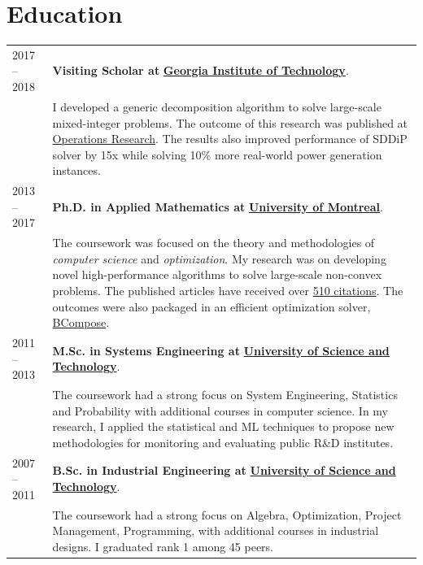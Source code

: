 \documentclass[10PT,letter]{article}
\newcommand{\numbox}[1]{} %
\begin{document}
\section*{\numbox{1}\bfseries\textcolor{titlecol}{\sffamily Education}}
	\begin{tabular}{p{1.2in}p{5.5in}}
			\textsc{2017 -- 2018} & \textbf{Visiting Scholar at} \href{https://www.isye.gatech.edu}{\textbf{Georgia Institute of Technology}}.
			\\[.5mm]
			&  I developed  a generic decomposition algorithm to solve large-scale mixed-integer problems. The outcome of this research was published at  \href{https://pubsonline.informs.org/doi/pdf/10.1287/opre.2019.1892}{Operations Research}. The results also improved performance of SDDiP solver by 15x while solving 10\% more real-world power generation instances.\\[.5mm] 
			\textsc{2013 -- 2017} & \textbf{{Ph.D. in Applied Mathematics} at} \href{https://www.polymtl.ca/magi/}{\textbf{University of Montreal}}.\\[.5mm]
			& The coursework was   focused on the  theory and methodologies of \textit{computer science} and \textit{optimization}. My research was  on developing novel high-performance algorithms to solve large-scale non-convex problems. The  published articles have received over \href{https://scholar.google.com/citations?hl=en&user=3V2o0Q0AAAAJ&view_op=list_works&sortby=pubdate}{510 citations}. The outcomes were also packaged in an efficient optimization solver,  \href{https://github.com/Ragheb2464/BCompose}{BCompose}.\\[.5mm] 
			\textsc{2011 -- 2013} &\textbf{ {M.Sc. in Systems Engineering} at} \href{http://www.iust.ac.ir/en}{\textbf{University of Science and Technology}}.\\[.5mm]
			& The coursework had a strong focus on System Engineering, Statistics and Probability  with additional courses in  computer science. In my research, I applied the statistical and ML techniques  to propose new methodologies for monitoring and evaluating  public R\&D institutes.\\[.5mm] 
			\textsc{2007 -- 2011} & \textbf{{B.Sc. in Industrial Engineering} at} \href{http://www.iust.ac.ir/en}{\textbf{University of Science and Technology}}.\\[.5mm]
			& The coursework had a strong focus on Algebra, Optimization, Project Management, Programming,  with additional courses in industrial designs. I graduated rank 1 among 45 peers. 
	\end{tabular}
 \\
\end{document}
